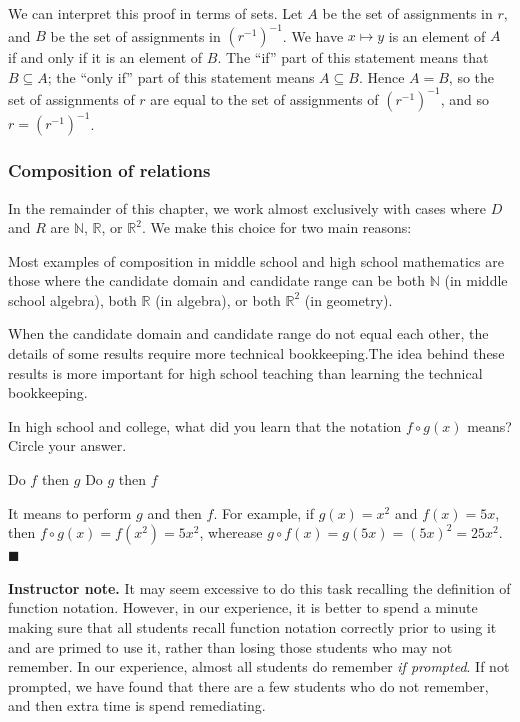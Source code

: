 \documentclass[11pt]{article}
\newcommand\smallnote[1]
	{\begin{mdframed}\raggedright  {\bf Instructor note.} {#1} \end{mdframed}}
\newenvironment{task}
	{\begin{mdframed}[linecolor=lightgray, linewidth=3pt]\raggedright}
	{\end{mdframed}}
\newcommand{\R}{\mathbb{R}}
\newcommand{\N}{\mathbb{N}}
\renewcommand\subset\subseteq
\theoremstyle{definition}
\newenvironment{solution}{{\it Solution.} }{\hfill {\color{lightgray}$\blacksquare$}}
\begin{document}
We can interpret this proof in terms of sets. Let $A$ be the set of assignments in $r$, and $B$ be the set of assignments in $(r^{-1})^{-1}$. We have $x\mapsto y$ is an element of $A$ if and only if it is an element of $B$. The ``if'' part of this statement means that $B\subset A$; the ``only if'' part of this statement means $A\subset B$. Hence $A=B$, so the set of assignments of $r$ are equal to the set of assignments of $(r^{-1})^{-1}$, and so $r=(r^{-1})^{-1}$.

\subsubsection{Composition of relations}
\label{s: composition}

In the remainder of this chapter, we work almost exclusively with cases where  $D$ and $R$ are $\N$, $\R$, or $\R^2$. We make this choice for two main reasons:
	\begin{itemize*}
	\item Most examples of composition in middle school and high school mathematics are those where the candidate domain and candidate range can be both $\N$ (in middle school algebra), both $\R$ (in algebra), or both $\R^2$ (in geometry).
	\item When the candidate domain and candidate range do not equal each other, the details of some results require more technical bookkeeping.The idea behind these results is more important for high school teaching than learning the technical bookkeeping.
	\end{itemize*}

\begin{task}
In high school and college, what did you learn that the notation $f\circ g(x)$ means? Circle your answer.
\centerline{Do $f$ then $g$ \quad\quad\quad Do $g$ then $f$}
\end{task}

\begin{solution}
It means to perform $g$ and then $f$. For example, if $g(x)=x^2$ and $f(x)=5x$, then $f\circ g(x)=f(x^2)=5x^2$, wherease $g\circ f(x)=g(5x)=(5x)^2=25x^2$.
\end{solution}

\smallnote{It may seem excessive to do this task recalling the definition of function notation. However, in our experience, it is better to spend a minute making sure that all students recall function notation correctly prior to using it and are primed to use it, rather than losing those students who may not remember. In our experience, almost all students do remember {\it if prompted}. If not prompted, we have found that there are a few students who do not remember, and then extra time is spend remediating.}
\end{document}
